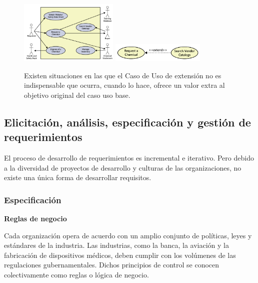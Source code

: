     \begin{figure}[h]
        \begin{multicols}{2}
            \centering
            \includegraphics[width=0.42\textwidth]{imgs/7.png}
            \includegraphics[width=0.4\textwidth]{imgs/8.png}
            
            \vspace{7mm}
            
            Existen situaciones en las que el Caso de Uso de extensión no es indispensable que ocurra, cuando lo hace, ofrece un valor extra al objetivo original del caso uso base.
        \end{multicols}
    \end{figure}
    
    \subsection*{Elicitación, análisis, especificación y gestión de requerimientos}
    
    El proceso de desarrollo de requerimientos es incremental e iterativo. Pero debido a la diversidad de proyectos de desarrollo y culturas de las organizaciones, no existe una única forma de desarrollar requisitos.
    
    \subsubsection*{Especificación}
    
    \textbf{Reglas de negocio}
    
     Cada organización opera de acuerdo con un amplio conjunto de políticas, leyes y estándares de la industria. Las industrias, como la banca, la aviación y la fabricación de dispositivos médicos, deben cumplir con los volúmenes de las regulaciones gubernamentales. Dichos principios de control se conocen colectivamente como reglas o lógica de negocio.
     
